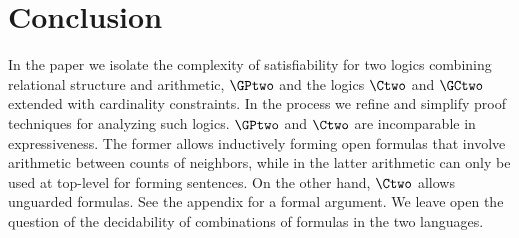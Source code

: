 \section{Conclusion} \label{sec:conc}

In the paper we isolate the complexity of satisfiability for two logics combining relational
structure and  arithmetic, $\GPtwo$ and 
the logics $\Ctwo$ and $\GCtwo$ extended with cardinality constraints. In the process we refine and
simplify proof techniques for analyzing such logics.  $\GPtwo$ and $\Ctwo$ are incomparable in expressiveness. The former allows inductively forming open formulas that involve arithmetic between counts of neighbors, while in the latter arithmetic can only be used at top-level for forming sentences. On the other hand, $\Ctwo$ allows unguarded formulas. See the appendix for a formal argument.
We leave open the question of the decidability of combinations of formulas in the two languages. 
